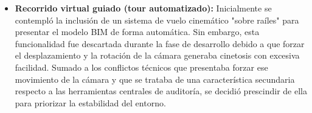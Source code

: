 \begin{itemize}
    \item \textbf{Recorrido virtual guiado (tour automatizado):} Inicialmente se contempló la inclusión de un sistema de vuelo cinemático "sobre raíles" para presentar el modelo BIM de forma automática. Sin embargo, esta funcionalidad fue descartada durante la fase de desarrollo debido a que forzar el desplazamiento y la rotación de la cámara generaba cinetosis con excesiva facilidad. Sumado a los conflictos técnicos que presentaba forzar ese movimiento de la cámara y que se trataba de una característica secundaria respecto a las herramientas centrales de auditoría, se decidió prescindir de ella para priorizar la estabilidad del entorno.
\end{itemize}



